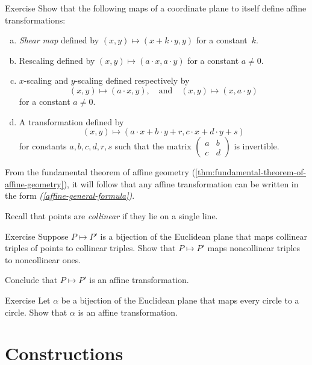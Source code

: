 \begin{thm}{Exercise}\label{ex:afine-linear}
Show that the following maps of a coordinate plane to itself define affine transformations:
\begin{enumerate}[(a)]
\item\label{ex:afine-linear:shear} \emph{Shear map} defined by $(x,y)\mapsto (x+k\cdot y,y)$ for a constant~$k$.
\item\label{ex:afine-linear:scaling}
Rescaling defined by $(x,y)\mapsto (a\cdot x,a\cdot y)$ for a constant $a\ne 0$.
\item $x$-scaling and $y$-scaling defined respectively by 
\[(x,y)\mapsto (a\cdot x,y),\quad\text{and}\quad(x,y)\mapsto (x,a\cdot y)\]
for a constant $a\ne 0$.
\item\label{affine-general-formula} A transformation defined by
\[(x,y)\mapsto(a\cdot x+b\cdot y+r,c\cdot x+d\cdot y+s)\]
for constants $a,b,c,d,r,s$ such that the matrix $(\begin{smallmatrix}a&b\\c&d\end{smallmatrix})$ is invertible. 
\end{enumerate}
\end{thm}

From the fundamental theorem of affine geometry (\ref{thm:fundamental-theorem-of-affine-geometry}), it will follow that any affine transformation can be written in the form \textit{(\ref{affine-general-formula})}.

Recall that points are \emph{collinear} if they lie on a single line.

\begin{thm}{Exercise}\label{ex:collinear=affine}
Suppose $P\mapsto P'$ is a bijection of the Euclidean plane that maps collinear triples of points to collinear triples.
Show that $P\mapsto P'$ maps noncollinear triples to noncollinear ones.

Conclude that $P\mapsto P'$ is an affine transformation.
\end{thm}

\begin{thm}{Exercise}\label{ex:circle=affine}
Let $\alpha$ be a bijection of the Euclidean plane that maps every circle to a circle.
Show that $\alpha$ is an affine transformation.
\end{thm}

\section{Constructions}

